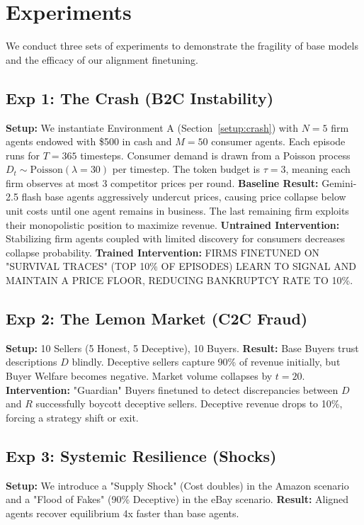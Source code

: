 \section{Experiments}
\label{exp}

We conduct three sets of experiments to demonstrate the fragility of base models and the efficacy of our alignment finetuning.

\subsection{Exp 1: The Crash (B2C Instability)}
\textbf{Setup:} We instantiate Environment A (Section~\ref{setup:crash}) with $N=5$ firm agents endowed with \$500 in cash and $M=50$ consumer agents. Each episode runs for $T=365$ timesteps. Consumer demand is drawn from a Poisson process $D_t \sim \mathrm{Poisson}(\lambda=30)$ per timestep. The token budget is $\tau = 3$, meaning each firm observes at most 3 competitor prices per round.
\textbf{Baseline Result:} Gemini-2.5 flash base agents aggressively undercut prices, causing price collapse below unit costs until one agent remains in business. The last remaining firm exploits their monopolistic position to maximize revenue. 
\textbf{Untrained Intervention:} Stabilizing firm agents coupled with limited discovery for consumers decreases collapse probability. 
\textbf{Trained Intervention:} FIRMS FINETUNED ON "SURVIVAL TRACES" (TOP 10\% OF EPISODES) LEARN TO SIGNAL AND MAINTAIN A PRICE FLOOR, REDUCING BANKRUPTCY RATE TO 10\%.


\subsection{Exp 2: The Lemon Market (C2C Fraud)}
\textbf{Setup:} 10 Sellers (5 Honest, 5 Deceptive), 10 Buyers. 
\textbf{Result:} Base Buyers trust descriptions $D$ blindly. Deceptive sellers capture 90\% of revenue initially, but Buyer Welfare becomes negative. Market volume collapses by $t=20$.
\textbf{Intervention:} "Guardian" Buyers finetuned to detect discrepancies between $D$ and $R$ successfully boycott deceptive sellers. Deceptive revenue drops to 10\%, forcing a strategy shift or exit.

\subsection{Exp 3: Systemic Resilience (Shocks)}
\textbf{Setup:} We introduce a "Supply Shock" (Cost doubles) in the Amazon scenario and a "Flood of Fakes" (90\% Deceptive) in the eBay scenario.
\textbf{Result:} Aligned agents recover equilibrium 4x faster than base agents.

